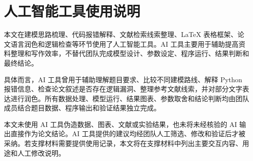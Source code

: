 \documentclass[UTF8,a4paper,zihao=5,fontset=fandol]{ctexart}
\numberwithin{equation}{section}
\numberwithin{figure}{section}
\numberwithin{table}{section}
\begin{document}
\section{人工智能工具使用说明}
本文在建模思路梳理、代码报错解释、文献检索线索整理、LaTeX 表格框架、论文语言润色和逻辑检查等环节使用了人工智能工具。AI 工具主要用于辅助提高资料整理和写作效率，不替代团队完成模型设计、参数设定、程序运行、结果判断和最终结论。

具体而言，AI 工具曾用于辅助理解题目要求、比较不同建模路线、解释 Python 报错信息、检查论文叙述是否存在逻辑漏洞、整理参考文献线索，并对部分文字表达进行润色。所有数据处理、模型运行、结果图表、参数取舍和结论判断均由团队成员结合题目数据、程序输出和验证结果独立完成。

本文未使用 AI 工具伪造数据、图表、文献或实验结果，也未将未经核验的 AI 输出直接作为论文结论。AI 工具提供的建议均经团队人工筛选、修改和验证后才被采纳。若支撑材料需要提供使用记录，本文将在支撑材料中列出主要交互内容、用途和人工修改说明。
\end{document}
